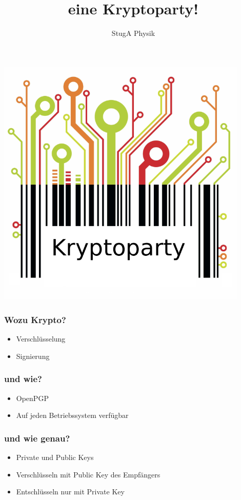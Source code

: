 \documentclass[14pt]{beamer}
\author{StugA Physik}
\title[Kryptoparty]{eine Kryptoparty!}
\begin{document}
\begin{frame}[plain]
    \begin{center}
        \includegraphics[keepaspectratio=true,width=0.9\textwidth]{kryptoparty_logo.pdf}
    \end{center}
\end{frame}


\begin{frame}
    \frametitle{Wozu Krypto?}
    \begin{itemize}
        \item Verschlüsselung
        \item Signierung
    \end{itemize}

\end{frame}

\begin{frame}
    \frametitle{und wie?}
    \begin{itemize}
        \item OpenPGP
        \item Auf jeden Betriebssystem verfügbar
    \end{itemize}

\end{frame}

\begin{frame}
    \frametitle{und wie genau?}
    \begin{itemize}
        \item Private und Public Keys
        \item Verschlüsseln mit Public Key des Empfängers
        \item Entschlüsseln nur mit Private Key
    \end{itemize}

\end{frame}
\end{document}
